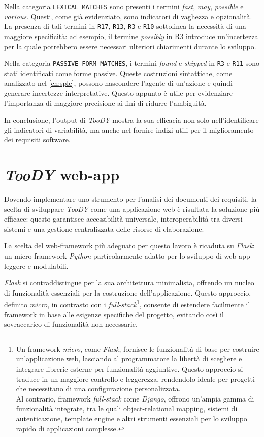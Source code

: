 \documentclass[12pt]{report}
\newcommand{\toody}{\textsl{TooDY}\xspace}
\newcommand{\python}{\textsl{Python}\xspace}
\newcommand{\flask}{\textsl{Flask}\xspace}
\newcommand{\django}{\textsl{Django}\xspace}
\begin{document}
Nella categoria \texttt{LEXICAL MATCHES} sono presenti i termini \textit{fast}, \textit{may}, \textit{possible} e \textit{various}. Questi, come già evidenziato, sono indicatori di vaghezza e opzionalità. La presenza di tali termini in \texttt{R17}, \texttt{R13}, \texttt{R3} e \texttt{R10} sottolinea la necessità di una maggiore specificità: ad esempio, il termine \textit{possibly} in R3 introduce un'incertezza per la quale potrebbero essere necessari ulteriori chiarimenti durante lo sviluppo.

Nella categoria \texttt{PASSIVE FORM MATCHES}, i termini \textit{found} e \textit{shipped} in \texttt{R3} e \texttt{R11} sono stati identificati come forme passive. Queste costruzioni sintattiche, come analizzato nel \cref{ch:sple}, possono nascondere l'agente di un'azione e quindi generare incertezze interpretative. Questo appunto è utile per evidenziare l'importanza di maggiore precisione ai fini di ridurre l'ambiguità.

In conclusione, l'output di \toody mostra la sua efficacia non solo nell'identificare gli indicatori di variabilità, ma anche nel fornire indizi utili per il miglioramento dei requisiti software.






\chapter{\toody web-app}
\label{ch:architettura}
Dovendo implementare uno strumento per l'analisi dei documenti dei requisiti, la scelta di sviluppare \toody come una applicazione web è risultata la soluzione più efficace: questo garantisce accessibilità universale, interoperabilità tra diversi sistemi e una gestione centralizzata delle risorse di elaborazione.

La scelta del web-framework più adeguato per questo lavoro è ricaduta su \flask: un micro-framework \python particolarmente adatto per lo sviluppo di web-app leggere e modulabili.

\flask si contraddistingue per la sua architettura minimalista, offrendo un nucleo di funzionalità essenziali per la costruzione dell'applicazione. Questo approccio, definito \textit{micro}, in contrasto con i \textit{full-stack}\footnote{Un framework \textit{micro}, come \flask, fornisce le funzionalità di base per costruire un'applicazione web, lasciando al programmatore la libertà di scegliere e integrare librerie esterne per funzionalità aggiuntive. Questo approccio si traduce in un maggiore controllo e leggerezza, rendendolo ideale per progetti che necessitano di una configurazione personalizzata.\\
Al contrario, framework \textit{full-stack} come \django, offrono un'ampia gamma di funzionalità integrate, tra le quali object-relational mapping, sistemi di autenticazione, template engine e altri strumenti essenziali per lo sviluppo rapido di applicazioni complesse.}, consente di estendere facilmente il framework in base alle esigenze specifiche del progetto, evitando così il sovraccarico di funzionalità non necessarie.
\end{document}
